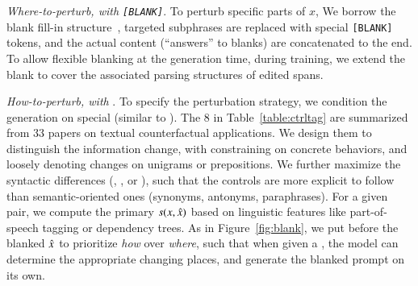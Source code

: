 \emph{Where-to-perturb, with \texttt{[BLANK]}}.
To perturb specific parts of $x$, We borrow the blank fill-in structure~\cite{donahue2020enabling}, \ie targeted subphrases are replaced with special \texttt{[BLANK]} tokens, and the actual content (``answers'' to blanks) are concatenated to the end. 
To allow flexible blanking at the generation time, during training, we extend the blank to cover the associated parsing structures of edited spans.

\emph{How-to-perturb, with \tagstrs}.
To specify the perturbation strategy, we condition the generation on special \tagstrs (similar to \citet{raffel2019exploring, Dathathri2020Plug}).
The 8 \tagstrs in Table~\ref{table:ctrltag} are summarized from 33 papers on textual counterfactual applications.
We design them to distinguish the information change, with \eg {} constraining on concrete behaviors, and  loosely denoting changes on unigrams or prepositions.
We further maximize the syntactic differences (\eg {}, , or ), such that the controls are more explicit to follow than semantic-oriented ones (synonyms, antonyms, paraphrases).
For a given pair, we compute the primary \tagstr $s(x, \hat{x})$ based on linguistic features like part-of-speech tagging or dependency trees.
As in Figure~\ref{fig:blank}, we put \tagstrs before the blanked $\hat{x}$ to prioritize \emph{how} over \emph{where}, such that when given a \tagstr, the model can determine the appropriate changing places, and generate the blanked prompt on its own. 


